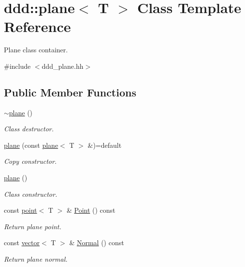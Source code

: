 \hypertarget{classddd_1_1plane}{}\section{ddd\+:\+:plane$<$ T $>$ Class Template Reference}
\label{classddd_1_1plane}


Plane class container.  




{\ttfamily \#include $<$ddd\+\_\+plane.\+hh$>$}

\subsection*{Public Member Functions}
\begin{DoxyCompactItemize}
\item 
\mbox{\label{classddd_1_1plane_aeaeb43102be169cd96f64a36d594dc30}} 
\hyperlink{classddd_1_1plane_aeaeb43102be169cd96f64a36d594dc30}{$\sim$plane} ()
\begin{DoxyCompactList}\small\item\em Class destructor. \end{DoxyCompactList}\item 
\mbox{\label{classddd_1_1plane_a52ed398bc1781834fde8b17ae329aefc}} 
\hyperlink{classddd_1_1plane_a52ed398bc1781834fde8b17ae329aefc}{plane} (const \hyperlink{classddd_1_1plane}{plane}$<$ T $>$ \&)=default
\begin{DoxyCompactList}\small\item\em Copy constructor. \end{DoxyCompactList}\item 
\mbox{\label{classddd_1_1plane_a4c3295ab6713fdcd2af22ca1d1072b36}} 
\hyperlink{classddd_1_1plane_a4c3295ab6713fdcd2af22ca1d1072b36}{plane} ()
\begin{DoxyCompactList}\small\item\em Class constructor. \end{DoxyCompactList}\item 
\mbox{\label{classddd_1_1plane_a17e86e433119b18b610f46b7035b328e}} 
const \hyperlink{classddd_1_1point}{point}$<$ T $>$ \& \hyperlink{classddd_1_1plane_a17e86e433119b18b610f46b7035b328e}{Point} () const
\begin{DoxyCompactList}\small\item\em Return plane point. \end{DoxyCompactList}\item 
\mbox{\label{classddd_1_1plane_ad15272cb68d76c2702633de0e919db32}} 
const \hyperlink{classddd_1_1vector}{vector}$<$ T $>$ \& \hyperlink{classddd_1_1plane_ad15272cb68d76c2702633de0e919db32}{Normal} () const
\begin{DoxyCompactList}\small\item\em Return plane normal. \end{DoxyCompactList}\end{DoxyCompactItemize}


